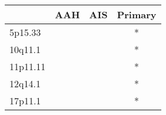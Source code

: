 \begin{tabular}{lccc}
\toprule
{} & AAH & AIS & Primary \\
\midrule
5p15.33  &     &     &       * \\
10q11.1  &     &     &       * \\
11p11.11 &     &     &       * \\
12q14.1  &     &     &       * \\
17p11.1  &     &     &       * \\
\bottomrule
\end{tabular}
